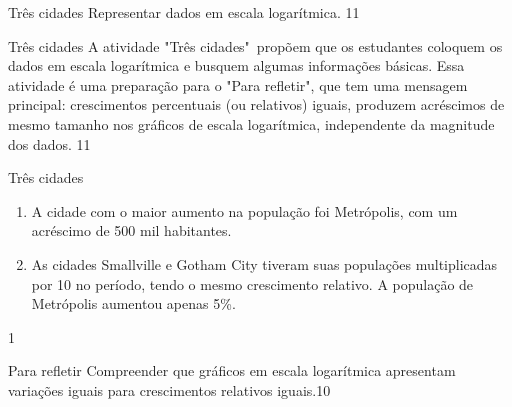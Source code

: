 \clearpage

\def\currentcolor{session4}
\begin{objectives}{Três cidades}
{
	Representar dados em escala logarítmica.
}{1}{1}
\end{objectives}
\begin{sugestions}{Três cidades}
{
	A atividade "Três cidades"\, propõem que os estudantes coloquem os dados em escala logarítmica e busquem algumas informações básicas. Essa atividade é uma preparação para o "Para refletir", que tem uma mensagem principal: crescimentos percentuais (ou relativos) iguais, produzem acréscimos de mesmo tamanho nos gráficos de escala logarítmica, independente da magnitude dos dados.
}{1}{1}
\end{sugestions}
\begin{answer}{Três cidades}
{
	\begin{center}
\end{center}
\begin{enumerate}
\item A cidade com o maior aumento na população  foi Metrópolis, com um acréscimo de 500 mil habitantes.
\item As cidades Smallville e Gotham City tiveram  suas populações multiplicadas por 10 no período, tendo o mesmo crescimento relativo. A população de Metrópolis aumentou apenas 5\%.
\end{enumerate}
}{1}
\end{answer}
\clearmargin
\begin{objectives}{Para refletir}
{Compreender que gráficos em escala logarítmica apresentam variações iguais para crescimentos relativos iguais.}{1}{0}
\end{objectives}
